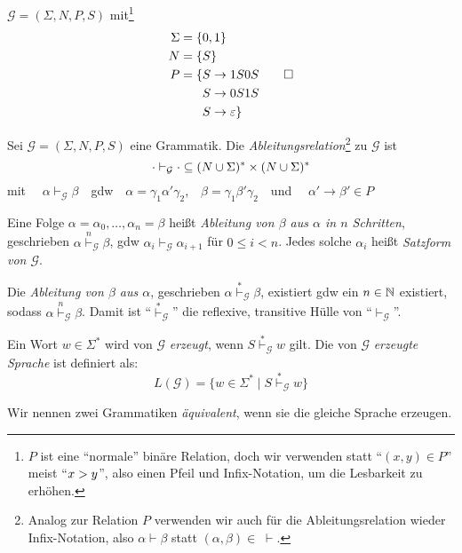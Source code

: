 \begin{Bsp}\label{bsp:3.sameNumber}
  $\mathcal{G} = (\Sigma, N, P, S)$ mit\footnote{$P$ ist eine "`normale"' binäre Relation, 
  doch wir verwenden statt "`$(x,y)\in P$"' meist "`$x\-> y$"', also einen Pfeil und Infix-Notation, um die Lesbarkeit zu erhöhen.}
	\begin{align*}
		\Sigma &= \{ 0, 1 \}\\
		N &= \{S\}\\
		P &= \begin{aligned}[t]
      \{ S & \to 1S0S \\
        S & \to 0S1S \\
        S & \to \varepsilon
      \}
        \end{aligned}
      \qedhere
	\end{align*}
\end{Bsp}
% 
%   
\begin{Def}
  Sei $\mathcal{G} =(\Sigma,N,P,S)$ eine Grammatik.
	Die \emph{Ableitungsrelation}\footnote{Analog zur Relation $P$ verwenden wir auch für die Ableitungsrelation wieder Infix-Notation, also $\alpha\vdash\beta$ statt $(\alpha,\beta)\in\;\vdash$.}
	zu $\mathcal{G}$ ist 
  \begin{displaymath}
    \cdot \vdash_\mathcal{G} \cdot \subseteq (N\cup\Sigma)^*\times(N\cup\Sigma)^*
  \end{displaymath}
  mit \ \ $\alpha \vdash_\mathcal{G} \beta$\ \  gdw\ \  $\alpha = \gamma_1\alpha'\gamma_2$,\ \  $\beta = \gamma_1\beta'\gamma_2$\ \  und \ \ $\alpha' \to \beta' \in P$

  Eine Folge $\alpha = \alpha_0,\ldots,\alpha_n = \beta$ heißt \emph{Ableitung von $\beta$ aus $\alpha$ in $n$ Schritten}, geschrieben $\alpha \stackrel{n}{\vdash}_\mathcal{G} \beta$, gdw $\alpha_i \vdash_\mathcal{G} \alpha_{i+1}$ für $0 \le i < n$.
  Jedes solche $\alpha_i$ heißt \emph{Satzform von $\mathcal{G}$}.

  Die \emph{Ableitung von $\beta$ aus $\alpha$}, geschrieben $\alpha \stackrel{*}{\vdash}_\mathcal{G} \beta$, existiert gdw ein $n \in \mathbb{N}$ existiert, sodass $\alpha \stackrel{n}{\vdash}_\mathcal{G} \beta$.
  Damit ist "`$\stackrel{*}{\vdash}_\mathcal{G}$"' die reflexive, transitive Hülle von "`$\vdash_\mathcal{G}$"'.

  Ein Wort $w\in\Sigma^*$ wird von $\mathcal{G}$ \emph{erzeugt}, wenn $S \stackrel{*}{\vdash}_{\mathcal{G}} w$ gilt.
	Die von $\mathcal{G}$ \emph{erzeugte Sprache} ist definiert als:
	\[ L(\mathcal{G}) = \{w\in\Sigma^* \mid S \stackrel{*}{\vdash}_{\mathcal{G}} w \}  \]
	
	Wir nennen zwei Grammatiken \emph{äquivalent}, wenn sie die gleiche Sprache erzeugen.
\end{Def}





